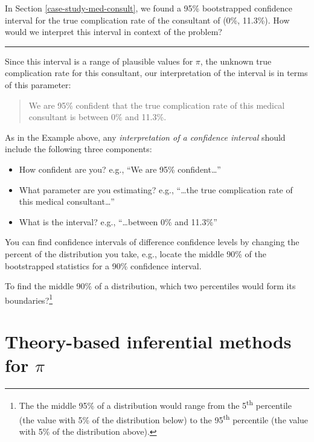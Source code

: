 \documentclass[
  10pt,
  openany]{book}
\providecommand{\tightlist}{%
  \setlength{\itemsep}{0pt}\setlength{\parskip}{0pt}}
\theoremstyle{definition}
\theoremstyle{definition}
\theoremstyle{definition}
\theoremstyle{definition}
\theoremstyle{remark}
\begin{document}
In Section \ref{case-study-med-consult}, we found a 95\% bootstrapped confidence interval for the true complication rate of the consultant of (0\%, 11.3\%). How would we interpret this interval in context of the problem?

\begin{center}\rule{0.5\linewidth}{0.5pt}\end{center}

Since this interval is a range of plausible values for \(\pi\), the unknown true complication rate for this consultant, our interpretation of the interval is in terms of this parameter:

\begin{quote}
We are 95\% confident that the true complication rate of this medical consultant is between 0\% and 11.3\%.
\end{quote}

As in the Example above, any \emph{interpretation of a confidence interval} should include the following three components:

\begin{itemize}
\tightlist
\item
  How confident are you? e.g., ``We are 95\% confident\ldots{}''
\item
  What parameter are you estimating? e.g., ``\ldots the true complication rate of this medical consultant\ldots{}''
\item
  What is the interval? e.g., ``\ldots between 0\% and 11.3\%''
\end{itemize}

You can find confidence intervals of difference confidence levels by changing the percent of the distribution you take, e.g., locate the middle 90\% of the bootstrapped statistics for a 90\% confidence interval.

To find the middle 90\% of a distribution, which two percentiles would form its boundaries?\footnote{The the middle 95\% of a distribution would range from the 5\textsuperscript{th} percentile (the value with 5\% of the distribution below) to the 95\textsuperscript{th} percentile (the value with 5\% of the distribution above).}

\section{\texorpdfstring{Theory-based inferential methods for \(\pi\)}{Theory-based inferential methods for \textbackslash pi}}\label{theory-prop}
\end{document}
